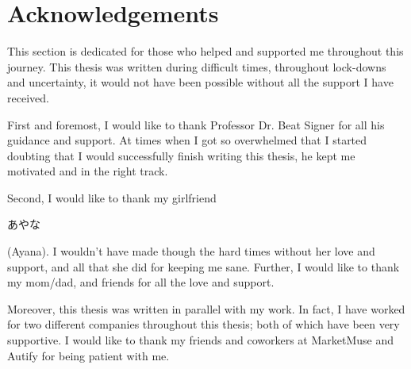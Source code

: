 \section*{Acknowledgements} \label{acknowledgements}

This section is dedicated for those who helped and supported me throughout this journey. This thesis was written during difficult times, throughout lock-downs and uncertainty, it would not have been possible without all the support I have received.

First and foremost, I would like to thank Professor Dr. Beat Signer for all his guidance and support. At times when I got so overwhelmed that I started doubting that I would successfully finish writing this thesis, he kept me motivated and in the right track. 

Second, I would like to thank my girlfriend \begin{CJK}{UTF8}{min}あやな\end{CJK} (Ayana). I wouldn't have made though the hard times without her love and support, and all that she did for keeping me sane. Further, I would like to thank my mom/dad, and friends for all the love and support. 

Moreover, this thesis was written in parallel with my work. In fact, I have worked for two different companies throughout this thesis; both of which have been very supportive. I would like to thank my friends and coworkers at MarketMuse and Autify for being patient with me.
